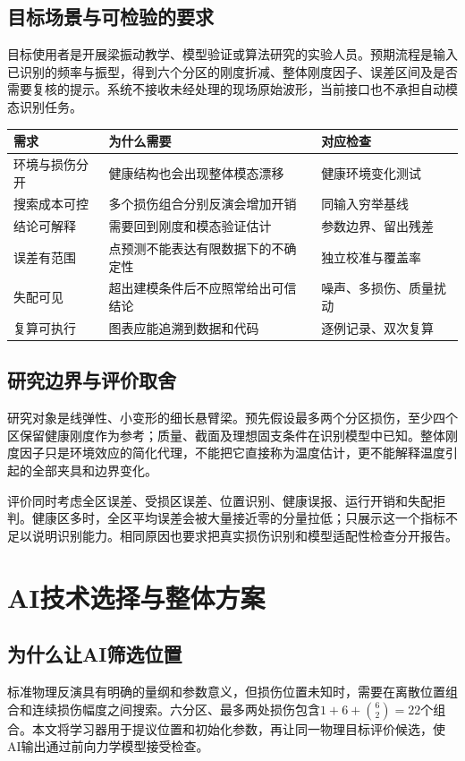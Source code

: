 \documentclass[UTF8,a4paper,11pt,fontset=fandol]{ctexart}
\begin{document}
\subsection{目标场景与可检验的要求}
目标使用者是开展梁振动教学、模型验证或算法研究的实验人员。预期流程是输入已识别的频率与振型，得到六个分区的刚度折减、整体刚度因子、误差区间及是否需要复核的提示。系统不接收未经处理的现场原始波形，当前接口也不承担自动模态识别任务。
\begin{center}\small\begin{tabular}{p{27mm}p{66mm}p{43mm}}\toprule
需求 & 为什么需要 & 对应检查\\\midrule
环境与损伤分开 & 健康结构也会出现整体模态漂移 & 健康环境变化测试\\
搜索成本可控 & 多个损伤组合分别反演会增加开销 & 同输入穷举基线\\
结论可解释 & 需要回到刚度和模态验证估计 & 参数边界、留出残差\\
误差有范围 & 点预测不能表达有限数据下的不确定性 & 独立校准与覆盖率\\
失配可见 & 超出建模条件后不应照常给出可信结论 & 噪声、多损伤、质量扰动\\
复算可执行 & 图表应能追溯到数据和代码 & 逐例记录、双次复算\\\bottomrule
\end{tabular}\end{center}
\subsection{研究边界与评价取舍}
研究对象是线弹性、小变形的细长悬臂梁。预先假设最多两个分区损伤，至少四个区保留健康刚度作为参考；质量、截面及理想固支条件在识别模型中已知。整体刚度因子只是环境效应的简化代理，不能把它直接称为温度估计，更不能解释温度引起的全部夹具和边界变化。

评价同时考虑全区误差、受损区误差、位置识别、健康误报、运行开销和失配拒判。健康区多时，全区平均误差会被大量接近零的分量拉低；只展示这一个指标不足以说明识别能力。相同原因也要求把真实损伤识别和模型适配性检查分开报告。

\newpage
\section{AI技术选择与整体方案}
\subsection{为什么让AI筛选位置}
标准物理反演具有明确的量纲和参数意义，但损伤位置未知时，需要在离散位置组合和连续损伤幅度之间搜索。六分区、最多两处损伤包含$1+6+\binom62=22$个组合。本文将学习器用于提议位置和初始化参数，再让同一物理目标评价候选，使AI输出通过前向力学模型接受检查。
\end{document}
